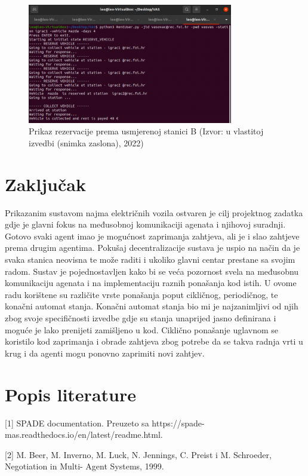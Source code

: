 \documentclass{foi}
\begin{document}
\begin{figure}[H]
	\centering
	\includegraphics[width=0.8\textwidth]{slike/vas11}
	\caption{Prikaz rezervacije prema usmjerenoj stanici B (Izvor: u vlastitoj izvedbi (snimka zaslona), 2022)}
\end{figure}


\chapter{Zaključak}

Prikazanim sustavom najma električnih vozila ostvaren je cilj projektnog zadatka gdje je glavni fokus na međusobnoj komunikaciji agenata i njihovoj suradnji. Gotovo svaki agent imao je mogućnost zaprimanja zahtjeva, ali je i slao zahtjeve prema drugim agentima. Pokušaj decentralizacije sustava je uspio na način da je svaka stanica neovisna te može raditi i ukoliko glavni centar prestane sa svojim radom. Sustav je pojednostavljen kako bi se veća pozornost svela na međusobnu komunikaciju agenata i na implementaciju raznih ponašanja kod istih. U ovome radu korištene su različite vrste ponašanja poput cikličnog, periodičnog, te konačni automat stanja. Konačni automat stanja bio mi je najzanimljivi od njih zbog svoje specifičnosti izvedbe gdje su stanja unaprijed jasno definirana i moguće je lako prenijeti zamišljeno u kod. Ciklično ponašanje uglavnom se koristilo kod zaprimanja i obrade zahtjeva zbog potrebe da se takva radnja vrti u krug i da agenti mogu ponovno zaprimiti novi zahtjev. 

\chapter{Popis literature}

[1] SPADE documentation. Preuzeto sa https://spade-mas.readthedocs.io/en/latest/readme.html.

[2] M. Beer, M. Inverno, M. Luck, N. Jennings, C. Preist i M. Schroeder, Negotiation in Multi- Agent Systems, 1999.
\end{document}
